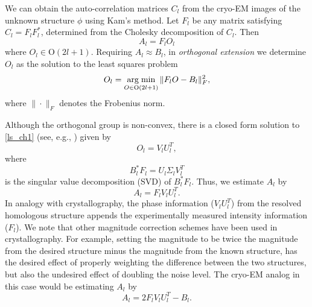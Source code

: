 We can obtain the auto-correlation matrices $C_l$ from the cryo-EM images of the
unknown structure $\phi$ using Kam's method.
Let $F_l$ be any matrix satisfying $C_l= F_l F_l^*$, determined from the
Cholesky decomposition of $C_l$. Then 
\begin{equation}
A_l = F_l O_l
\end{equation}
where $O_l \in \text{O}(2l+1)$. Requiring $A_l \approx B_l$, in {\em orthogonal extension} we determine $O_l$ as the solution to the
least squares problem
\begin{equation}\label{ls_ch1}
O_l=\operatorname*{arg\; min}_{O \in \text{O}(2l+1)}  \|F_l O - B_l\|_F^2,
\end{equation}
where $\|\cdot\|_F$ denotes the Frobenius norm. 

Although the orthogonal group is non-convex, there is a closed form solution to \eqref{ls_ch1} (see, e.g., \cite{Keller1975}) given by
\begin{equation}
O_l= V_l U_l^T,
\end{equation}
where 
\begin{equation}
B_l^* F_l = U_l \Sigma_l V_l^T
\end{equation}
is the singular value decomposition (SVD) of $B_l^* F_l$. Thus, we estimate $A_l$ by 
\begin{equation}
A_l = F_l V_l U_l^T.
\end{equation} 
In analogy with crystallography, the phase
information ($V_l U_l^T$) from the resolved homologous
structure appends the experimentally measured intensity information ($F_l$). We note that other magnitude correction schemes have been used in crystallography. For example, setting the magnitude to be twice the magnitude from the desired structure minus the magnitude from the known structure, has the desired effect of properly weighting the difference between the two structures, but also the undesired effect of doubling the noise level. The cryo-EM analog in this case would be estimating $A_l$ by 
\begin{equation}
A_l = 2F_l V_l U_l^T - B_l.
\end{equation}

